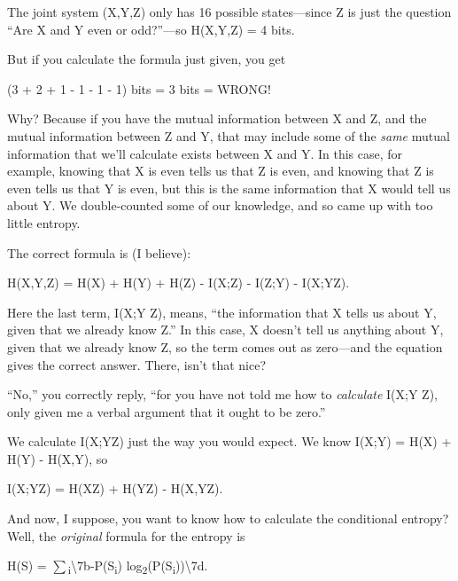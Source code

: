 {
 The joint system (X,Y,Z) only has 16 possible states---since Z is
just the question ``Are X and Y even or
odd?''---so H(X,Y,Z) = 4 bits.}

{
 But if you calculate the formula just given, you get}

{\centering
 (3 + 2 + 1 - 1 - 1 - 1) bits = 3 bits = WRONG!
\par}


\bigskip

{
 Why? Because if you have the mutual information between X and Z,
and the mutual information between Z and Y, that may include some of
the \textit{same} mutual information that we'll
calculate exists between X and Y. In this case, for example, knowing
that X is even tells us that Z is even, and knowing that Z is even
tells us that Y is even, but this is the same information that X would
tell us about Y. We double-counted some of our knowledge, and so came
up with too little entropy. }

{
 The correct formula is (I believe):}

{\centering
 H(X,Y,Z) = H(X) + H(Y) + H(Z) - I(X;Z) - I(Z;Y) -
I(X;Y{\textbar}Z).
\par}


\bigskip

{
 Here the last term, I(X;Y {\textbar}Z), means,
``the information that X tells us about Y, given that
we already know Z.'' In this case, X
doesn't tell us anything about Y, given that we already
know Z, so the term comes out as zero---and the equation gives the
correct answer. There, isn't that nice? }

{
 ``No,'' you correctly reply,
``for you have not told me how to \textit{calculate}
I(X;Y {\textbar}Z), only given me a verbal argument that it ought to be
zero.''}

{
 We calculate I(X;Y{\textbar}Z) just the way you would expect. We
know I(X;Y) = H(X) + H(Y) - H(X,Y), so}

{\centering
 I(X;Y{\textbar}Z) = H(X{\textbar}Z) + H(Y{\textbar}Z) -
H(X,Y{\textbar}Z).
\par}


\bigskip

{
 And now, I suppose, you want to know how to calculate the
conditional entropy? Well, the \textit{original} formula for the
entropy is}

{\centering
 H(S) =
${\sum}$\textsubscript{i}{\textbackslash}{\textquotesingle}7b-P(S\textsubscript{i})
{\texttimes}
log\textsubscript{2}(P(S\textsubscript{i})){\textbackslash}{\textquotesingle}7d.
\par}


